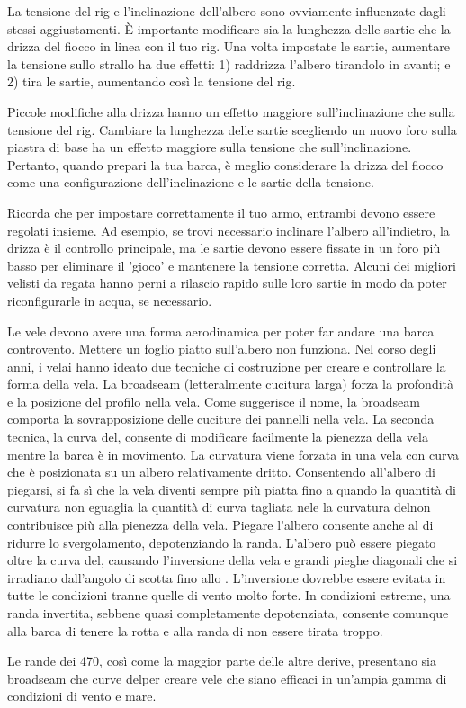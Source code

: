 La tensione del rig e l'inclinazione dell'albero sono ovviamente influenzate
dagli stessi aggiustamenti. È importante modificare sia la lunghezza delle
sartie che la drizza del fiocco in linea con il tuo rig. Una volta impostate le
sartie, aumentare la tensione sullo strallo ha due effetti: 1) raddrizza
l'albero tirandolo in avanti; e 2) tira le sartie, aumentando
così la tensione del rig.

Piccole modifiche alla drizza hanno un effetto maggiore sull'inclinazione che
sulla tensione del rig. Cambiare la lunghezza delle sartie scegliendo un nuovo
foro sulla piastra di base ha un effetto maggiore sulla tensione che
sull'inclinazione. Pertanto, quando prepari la tua barca, è meglio considerare
la drizza del fiocco come una configurazione dell'inclinazione e le sartie della
tensione.

Ricorda che per impostare correttamente il tuo armo, entrambi devono essere
regolati insieme. Ad esempio, se trovi necessario inclinare l'albero
all'indietro, la drizza è il controllo principale, ma le sartie devono essere
fissate in un foro più basso per eliminare il 'gioco' e mantenere la tensione
corretta. Alcuni dei migliori velisti da regata hanno perni a rilascio rapido
sulle loro sartie in modo da poter riconfigurarle in acqua, se necessario.

Le vele devono avere una forma aerodinamica per poter far andare una barca
controvento. Mettere un foglio piatto sull'albero non funziona. Nel corso degli
anni, i velai hanno ideato due tecniche di costruzione per creare e controllare
la forma della vela. La broadseam (letteralmente cucitura larga) forza la
profondità e la posizione del profilo nella vela. Come suggerisce il nome, la
broadseam comporta la sovrapposizione delle cuciture dei pannelli nella
vela.
%
La seconda tecnica, la curva del\theluff, consente di modificare facilmente la
pienezza della vela mentre la barca è in movimento. La curvatura viene forzata
in una vela con \aluff curva che è posizionata su un albero relativamente
dritto. Consentendo all'albero di piegarsi, si fa sì che la vela diventi sempre
più piatta fino a quando la quantità di curvatura non eguaglia la quantità di
curva tagliata nel\theluff e la curvatura del\theluff non contribuisce più alla
pienezza della vela. Piegare l'albero consente anche al \leech di ridurre lo
svergolamento, depotenziando la randa. L'albero può essere piegato oltre la
curva del\theluff, causando l'inversione della vela e grandi pieghe diagonali
che si irradiano dall'angolo di scotta fino allo \spreader. L'inversione dovrebbe
essere evitata in tutte le condizioni tranne quelle di vento molto forte. In
condizioni estreme, una randa invertita, sebbene quasi completamente
depotenziata, consente comunque alla barca di tenere la rotta e alla randa di
non essere tirata troppo.

Le rande dei 470, così come la maggior parte delle altre derive, presentano sia
broadseam che curve del\theluff per creare vele che siano efficaci in
un'ampia gamma di condizioni di vento e mare.